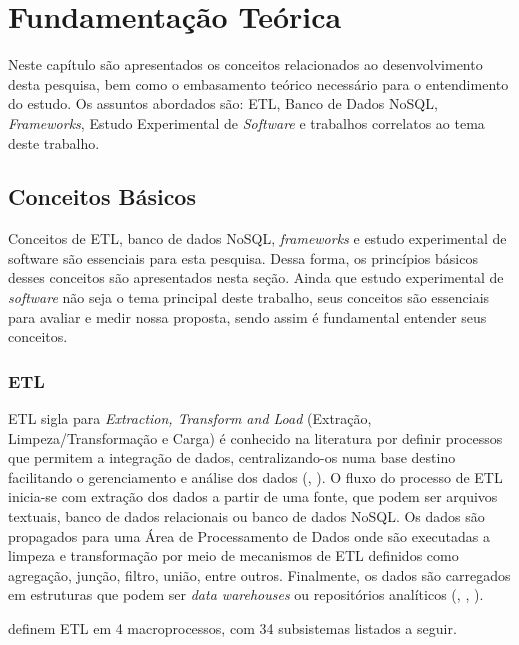 \chapter{Fundamentação Teórica}

Neste capítulo são apresentados os conceitos relacionados ao desenvolvimento desta pesquisa, bem como o embasamento teórico necessário para o entendimento do estudo. Os assuntos abordados são: ETL, Banco de Dados NoSQL, \textit{Frameworks}, Estudo Experimental de \textit{Software} e trabalhos correlatos ao tema deste trabalho.


\clearpage

\section{Conceitos Básicos}

Conceitos de ETL, banco de dados NoSQL, \textit{frameworks} e estudo experimental de software são essenciais para esta pesquisa. Dessa forma, os princípios básicos desses conceitos são apresentados nesta seção. Ainda que estudo experimental de \textit{software} não seja o tema principal deste trabalho, seus conceitos são essenciais para avaliar e medir nossa proposta, sendo assim é fundamental entender seus conceitos.

\subsection{ETL}

ETL sigla para \textit{Extraction, Transform and Load} (Extração, Limpeza/Transformação e Carga) é conhecido na literatura por definir processos que permitem a integração de dados, centralizando-os numa base destino facilitando o gerenciamento e análise dos dados (\cite{kimball:2004}, \cite{rud:2009}). O fluxo do processo de ETL inicia-se com extração dos dados a partir de uma fonte, que podem ser arquivos textuais, banco de dados relacionais ou banco de dados NoSQL. Os dados são propagados para uma Área de Processamento de Dados onde são executadas a limpeza e transformação por meio de mecanismos de ETL definidos como agregação, junção, filtro, união, entre outros. Finalmente, os dados são carregados em estruturas que podem ser \textit{data warehouses} ou repositórios analíticos (\cite{silva:2016}, \cite{silva:2012}, \cite{kimball:2004}). 

\cite{kimball:2004} definem ETL em 4 macroprocessos, com 34 subsistemas listados a seguir. 

